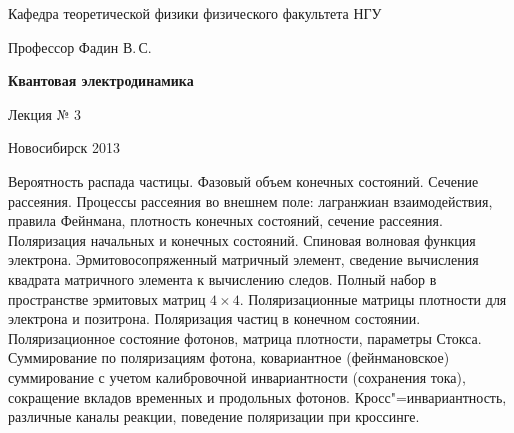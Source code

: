 \documentclass[12pt,pagesize,paper=landscape,paper=192mm:108mm]{scrbook}
\begin{document}
\begin{titlepage}
\begin{center}
    Кафедра теоретической физики физического факультета НГУ
    \medskip

    \Large
    Профессор Фадин В.\,С.
    \bigskip

    \huge
    \textbf{Квантовая электродинамика}
    \bigskip

    \Large
    Лекция № 3
    \vfill

    \normalsize
    \vfill

    \normalsize \ccbysa\hspace{0.5em}  Новосибирск 2013
  \end{center}
\end{titlepage}
\newpage

\vspace*{-1em}
\begin{center}
\vfill
  \begin{minipage}{0.65\linewidth}
    Вероятность распада частицы. Фазовый объем конечных
    состояний. Сечение рассеяния.  Процессы рассеяния во внешнем поле:
    лагранжиан взаимодействия, правила Фейнмана, плотность конечных
    состояний, сечение рассеяния. Поляризация начальных и конечных
    состояний. Спиновая волновая функция
    электрона. Эрмитовосопряженный матричный элемент, сведение
    вычисления квадрата матричного элемента к вычислению
    следов. Полный набор в пространстве эрмитовых матриц $4 \times
    4$. Поляризационные матрицы плотности для электрона и
    позитрона. Поляризация частиц в конечном
    состоянии. Поляризационное состояние фотонов, матрица плотности,
    параметры Стокса. Суммирование по поляризациям фотона,
    ковариантное (фейнмановское) суммирование с учетом калибровочной
    инвариантности (сохранения тока), сокращение вкладов временных и
    продольных фотонов.  Кросс"=инвариантность, различные каналы
    реакции, поведение поляризации при кроссинге.
  \end{minipage}
  \vfill

\end{center}
\end{document}

